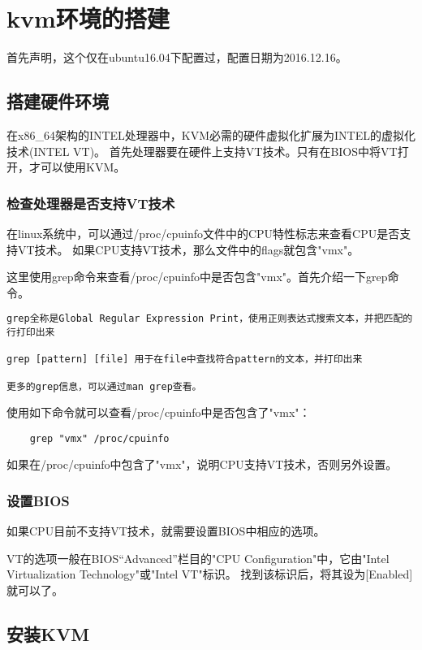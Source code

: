 \documentclass[a4paper,left=2.5cm,right=2.5cm,11pt]{article}
\begin{document}
\tableofcontents

\clearpage

\section{kvm环境的搭建}
	首先声明，这个仅在ubuntu16.04下配置过，配置日期为2016.12.16。

\subsection{搭建硬件环境}
	在x86\_64架构的INTEL处理器中，KVM必需的硬件虚拟化扩展为INTEL的虚拟化技术(INTEL VT)。
	首先处理器要在硬件上支持VT技术。只有在BIOS中将VT打开，才可以使用KVM。
\subsubsection{检查处理器是否支持VT技术}
	在linux系统中，可以通过/proc/cpuinfo文件中的CPU特性标志来查看CPU是否支持VT技术。
	如果CPU支持VT技术，那么文件中的flags就包含"vmx"。\par
	这里使用grep命令来查看/proc/cpuinfo中是否包含"vmx"。首先介绍一下grep命令。
	\begin{lstlisting}[numberstyle=\color{white}]
grep全称是Global Regular Expression Print，使用正则表达式搜索文本，并把匹配的行打印出来

grep [pattern] [file] 用于在file中查找符合pattern的文本，并打印出来

更多的grep信息，可以通过man grep查看。
	\end{lstlisting}

	使用如下命令就可以查看/proc/cpuinfo中是否包含了"vmx"：
	\begin{lstlisting}
	grep "vmx" /proc/cpuinfo
	\end{lstlisting}
	
	如果在/proc/cpuinfo中包含了"vmx"，说明CPU支持VT技术，否则另外设置。

\subsubsection{设置BIOS}
	如果CPU目前不支持VT技术，就需要设置BIOS中相应的选项。\par
	VT的选项一般在BIOS“Advanced”栏目的"CPU Configuration"中，它由"Intel Virtualization Technology"或"Intel VT"标识。
	找到该标识后，将其设为[Enabled]就可以了。

\subsection{安装KVM}
\end{document}
